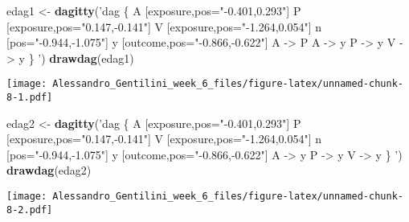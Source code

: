 \documentclass[]{article}
\newenvironment{Shaded}{\begin{snugshade}}{\end{snugshade}}
\newcommand{\KeywordTok}[1]{\textcolor[rgb]{0.13,0.29,0.53}{\textbf{{#1}}}}
\newcommand{\StringTok}[1]{\textcolor[rgb]{0.31,0.60,0.02}{{#1}}}
\newcommand{\NormalTok}[1]{{#1}}
\begin{document}
\begin{Shaded}
\begin{Highlighting}[]
\NormalTok{edag1 <-}\StringTok{ }\KeywordTok{dagitty}\NormalTok{(}\StringTok{'dag \{}
\StringTok{A [exposure,pos="-0.401,0.293"]}
\StringTok{P [exposure,pos="0.147,-0.141"]}
\StringTok{V [exposure,pos="-1.264,0.054"]}
\StringTok{n [pos="-0.944,-1.075"]}
\StringTok{y [outcome,pos="-0.866,-0.622"]}
\StringTok{A -> P}
\StringTok{A -> y}
\StringTok{P -> y}
\StringTok{V -> y}
\StringTok{\}}
\StringTok{'}\NormalTok{)}
\KeywordTok{drawdag}\NormalTok{(edag1)}
\end{Highlighting}
\end{Shaded}

\texttt{[image: Alessandro\_Gentilini\_week\_6\_files/figure-latex/unnamed-chunk-8-1.pdf]}

\begin{Shaded}
\begin{Highlighting}[]
\NormalTok{edag2 <-}\StringTok{ }\KeywordTok{dagitty}\NormalTok{(}\StringTok{'dag \{}
\StringTok{A [exposure,pos="-0.401,0.293"]}
\StringTok{P [exposure,pos="0.147,-0.141"]}
\StringTok{V [exposure,pos="-1.264,0.054"]}
\StringTok{n [pos="-0.944,-1.075"]}
\StringTok{y [outcome,pos="-0.866,-0.622"]}
\StringTok{A -> y}
\StringTok{P -> y}
\StringTok{V -> y}
\StringTok{\}}
\StringTok{'}\NormalTok{)}
\KeywordTok{drawdag}\NormalTok{(edag2)}
\end{Highlighting}
\end{Shaded}

\texttt{[image: Alessandro\_Gentilini\_week\_6\_files/figure-latex/unnamed-chunk-8-2.pdf]}
\end{document}
